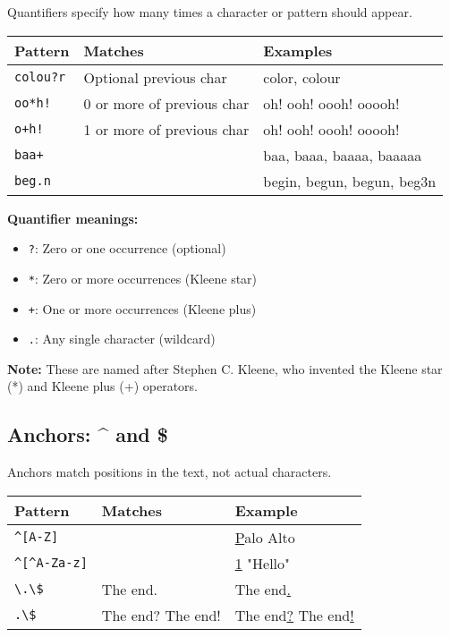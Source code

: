 \documentclass[11pt,a4paper]{article}
\theoremstyle{definition}
\theoremstyle{plain}
\theoremstyle{remark}
\begin{document}
Quantifiers specify how many times a character or pattern should appear.

\begin{table}[h]
\centering
\begin{tabular}{|l|l|l|}
\hline
\textbf{Pattern} & \textbf{Matches} & \textbf{Examples} \\
\hline
\texttt{colou?r} & Optional previous char & color, colour \\
\hline
\texttt{oo*h!} & 0 or more of previous char & oh! ooh! oooh! ooooh! \\
\hline
\texttt{o+h!} & 1 or more of previous char & oh! ooh! oooh! ooooh! \\
\hline
\texttt{baa+} & & baa, baaa, baaaa, baaaaa \\
\hline
\texttt{beg.n} & & begin, begun, begun, beg3n \\
\hline
\end{tabular}
\end{table}

\textbf{Quantifier meanings:}
\begin{itemize}
    \item \texttt{?}: Zero or one occurrence (optional)
    \item \texttt{*}: Zero or more occurrences (Kleene star)
    \item \texttt{+}: One or more occurrences (Kleene plus)
    \item \texttt{.}: Any single character (wildcard)
\end{itemize}

\textbf{Note:} These are named after Stephen C. Kleene, who invented the Kleene star (*) and Kleene plus (+) operators.

\newpage
\subsection{Anchors: \^{} and \$}

Anchors match positions in the text, not actual characters.

\begin{table}[h]
\centering
\begin{tabular}{|l|l|l|}
\hline
\textbf{Pattern} & \textbf{Matches} & \textbf{Example} \\
\hline
\texttt{\^{}[A-Z]} & & \underline{P}alo Alto \\
\hline
\texttt{\^{}[\^{}A-Za-z]} & & \underline{1} "Hello" \\
\hline
\verb|\.\$| & The end. & The end\underline{.} \\
\hline
\verb|.\$| & The end? The end! & The end\underline{?} The end\underline{!} \\
\hline
\end{tabular}
\end{table}
\end{document}
